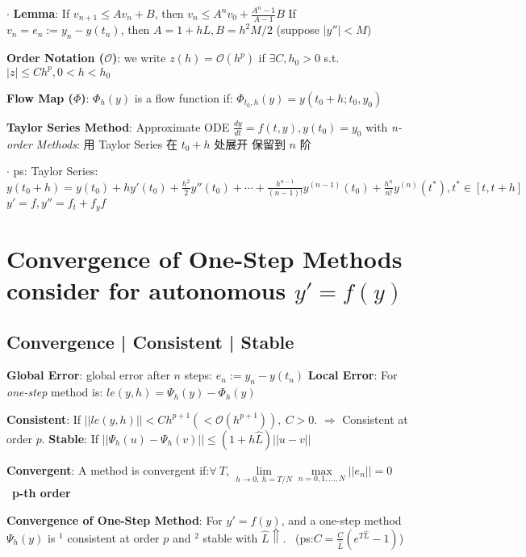 \documentclass[9pt]{article}
\begin{document}
$\cdot$ \textbf{Lemma}: If $v_{n+1}\leq Av_n+B$, then $v_n\leq A^nv_0+\frac{A^n-1}{A-1}B$ \quad If $v_{n}=e_n:=y_n-y(t_n)$, then $A=1+hL,B=h^2M/2$ {\scriptsize (suppose $|y''|<M$)}

\textbf{Order Notation ($\mathcal{O}$)}: we write $z(h)=\mathcal{O}(h^p)$ if $\exists C,h_0>0$ s.t. $|z|\leq Ch^p,0<h<h_0$

\textbf{Flow Map ($\Phi$)}: {\small $\Phi_h(y)$ is a flow function if: $\Phi_{t_0,h}(y)=y(t_0+h;t_0,y_0)$} 

\textbf{Taylor Series Method}: {\small Approximate ODE $\frac{dy}{dt}=f(t,y),y(t_0)=y_0$ with \textit{n-order Methods}: 用 Taylor Series 在 $t_0+h$ 处展开 保留到 $n$ 阶}

$\cdot$ ps: {\footnotesize Taylor Series: $y(t_0+h)=y(t_0)+hy'(t_0)+\frac{h^2}{2}y''(t_0)+\cdots+\frac{h^{n-1}}{(n-1)!}y^{(n-1)}(t_0)+\frac{h^n}{n!}y^{(n)}(t^*),t^*\in[t,t+h]$ \quad $y'=f,y''=f_t+f_yf$}


\section{Convergence of One-Step Methods {\scriptsize consider for autonomous $y'=f(y)$}} %

\subsection{Convergence | Consistent | Stable} %
\textbf{Global Error}: global error after $n$ steps: $e_n:=y_n-y(t_n)$ \quad \textbf{Local Error}: {\small For \textit{one-step} method is: $le(y,h)=\Psi_h(y)-\Phi_h(y)$}

\textbf{Consistent}: {\small If $||le(y,h)||<Ch^{p+1} (<\mathcal{O}(h^{p+1})), \ C>0$. $\Rightarrow$ Consistent at order $p$.} \quad \textbf{Stable}: If $||\Psi_h(u)-\Psi_h(v)||\leq(1+h\widehat{L})||u-v||$

\textbf{Convergent}: {\small A method is convergent if:$\forall \ T$, $\lim\limits_{h\to0,\ h=T/N}\max\limits_{n=0,1,...,N}||e_n||=0$} \quad \quad {} \ {\tiny \textbf{p-th order}}

\vspace{-2pt}
\textbf{Convergence of One-Step Method}: {\small For $y'=f(y)$, and a one-step method $\Psi_h(y)$ is $^1$ consistent at order $p$ and $^2$ stable with $\widehat{L}\Uparrow$.} \ {\tiny (ps:$C=\frac{C}{\widehat{L}}(e^{T\widehat{L}}-1)$)}
\end{document}
